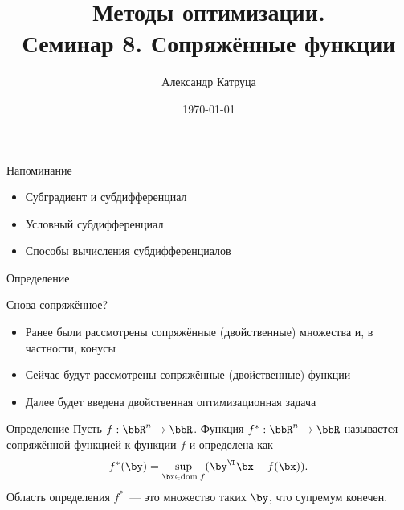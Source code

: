 \documentclass[12pt]{beamer}
\title[Семинар 8]{Методы оптимизации. \\
 Семинар 8. Сопряжённые функции}
\author{Александр Катруца}
\institute{Московский физико-технический институт,\\
Факультет Управления и Прикладной Математики}
\date{\today}
\begin{document}
\begin{frame}
\maketitle
\end{frame}

\begin{frame}{Напоминание}
\begin{itemize}
\item Субградиент и субдифференциал
\item Условный субдифференциал
\item Способы вычисления субдифференциалов
\end{itemize}
\end{frame}

\begin{frame}{Определение}
\begin{block}{Снова сопряжённое?}
\begin{itemize}
\item Ранее были рассмотрены сопряжённые (двойственные) множества и, в частности, конусы
\item Сейчас будут рассмотрены сопряжённые (двойственные) функции
\item Далее будет введена двойственная оптимизационная задача 
\end{itemize}
\end{block}

\begin{block}{Определение}
Пусть $f: \bbR^n \rightarrow \bbR$. 
Функция $f^*: \bbR^n \rightarrow \bbR$ называется сопряжённой функцией к функции $f$ и определена как
\vspace{-4mm}
\[
f^*(\by) = \sup\limits_{\bx \in \mathrm{dom} \; f} (\by^{\T}\bx - f(\bx)).
\vspace{-3mm}
\]
Область определения $f^*$~--- это множество таких $\by$, что супремум конечен. 

\end{block}
\end{frame}
\end{document}
